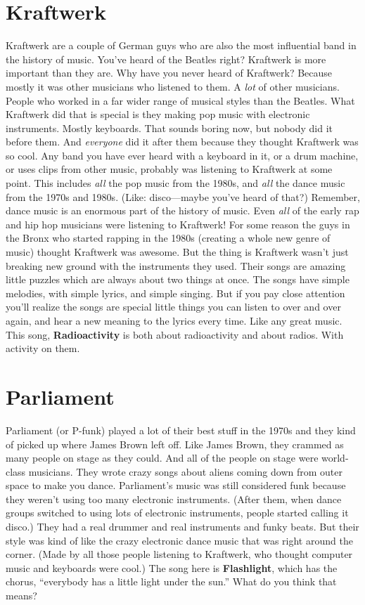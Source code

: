 \documentclass[letterpaper,single]{article}
\begin{document}
\section{Kraftwerk}
Kraftwerk are a couple of German guys who are also the most influential band in the history of music. 
You've heard of the Beatles right? 
Kraftwerk is more important than they are. 
Why have you never heard of Kraftwerk? 
Because mostly it was other musicians who listened to them. 
A \emph{lot} of other musicians. 
People who worked in a far wider range of musical styles than the Beatles. 
What Kraftwerk did that is special is they making pop music with electronic instruments. 
Mostly keyboards. 
That sounds boring now, but nobody did it before them. 
And \emph{everyone} did it after them because they thought Kraftwerk was so cool. 
Any band you have ever heard with a keyboard in it, or a drum machine, or uses clips from other music, probably was listening to Kraftwerk at some point. 
This includes \emph{all} the pop music from the 1980s, and \emph{all} the dance music from the 1970s and 1980s. (Like: disco---maybe you've heard of that?)
Remember, dance music is an enormous part of the history of music.
Even \emph{all} of the early rap and hip hop musicians were listening to Kraftwerk! 
For some reason the guys in the Bronx who started rapping in the 1980s (creating a whole new genre of music) thought Kraftwerk was awesome. 
But the thing is Kraftwerk wasn't just breaking new ground with the instruments they used. 
Their songs are amazing little puzzles which are always about two things at once. 
The songs have simple melodies, with simple lyrics, and simple singing. 
But if you pay close attention you'll realize the songs are special little things you can listen to over and over again, and hear a new meaning to the lyrics every time. 
Like any great music. 
This song, \textbf{Radioactivity} is both about radioactivity and about radios. With activity on them.

\section{Parliament}
Parliament (or P-funk) played a lot of their best stuff in the 1970s and they kind of picked up where James Brown left off. 
Like James Brown, they crammed as many people on stage as they could. 
And all of the people on stage were world-class musicians. 
They wrote crazy songs about aliens coming down from outer space to make you dance. 
Parliament's music was still considered funk because they weren't using too many electronic instruments. 
(After them, when dance groups switched to using lots of electronic instruments, people started calling it disco.) 
They had a real drummer and real instruments and funky beats.
But their style was kind of like the crazy electronic dance music that was right around the corner. 
(Made by all those people listening to Kraftwerk, who thought computer music and keyboards were cool.)
The song here is \textbf{Flashlight}, which has the chorus, ``everybody has a little light under the sun.'' 
What do you think that means?
\end{document}
